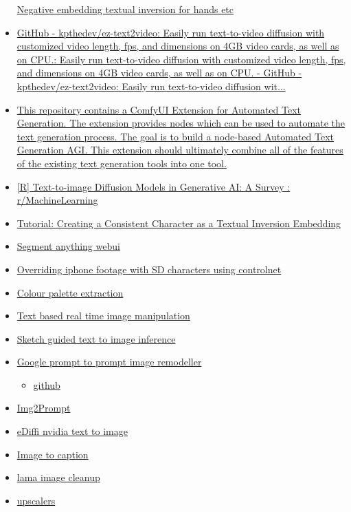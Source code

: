 \begin{itemize}
  \href{https://huggingface.co/datasets/Nerfgun3/bad_prompt}{Negative
  embedding textual inversion for hands etc}
\item
  \href{https://github.com/kpthedev/ez-text2video}{GitHub -
  kpthedev/ez-text2video: Easily run text-to-video diffusion with
  customized video length, fps, and dimensions on 4GB video cards, as
  well as on CPU.: Easily run text-to-video diffusion with customized
  video length, fps, and dimensions on 4GB video cards, as well as on
  CPU. - GitHub - kpthedev/ez-text2video: Easily run text-to-video
  diffusion wit...}
\item
  \href{https://github.com/xXAdonesXx/NodeGPT}{This repository contains
  a ComfyUI Extension for Automated Text Generation. The extension
  provides nodes which can be used to automate the text generation
  process. The goal is to build a node-based Automated Text Generation
  AGI. This extension should ultimately combine all of the features of
  the existing text generation tools into one tool.}
\item
  \href{https://www.reddit.com/r/MachineLearning/comments/12ehcez/r_texttoimage_diffusion_models_in_generative_ai_a/}{{[}R{]}
  Text-to-image Diffusion Models in Generative AI: A Survey :
  r/MachineLearning}
\item
  \href{https://github.com/BelieveDiffusion/tutorials/discussions/3}{Tutorial:
  Creating a Consistent Character as a Textual Inversion Embedding}
\item
  \href{https://www.reddit.com/r/StableDiffusion/comments/12hkdy8/sd_webui_segment_everything/}{Segment
  anything webui}
\item
  \href{https://www.reddit.com/r/StableDiffusion/comments/12lg8mn/override_more_experiments_overriding_the_original/}{Overriding
  iphone footage with SD characters using controlnet}
\item
  \href{https://github.com/mattdesl/gifenc}{Colour palette extraction}
\item
  \href{https://arxiv.org/abs/2210.09276}{Text based real time image
  manipulation}
\item
  \href{https://sketch-guided-diffusion.github.io/}{Sketch guided text
  to image inference}
\item
  \href{https://www.youtube.com/watch?v=lHcPtbZ0Mnc}{Google prompt to
  prompt image remodeller}

  \begin{itemize}
   
  \item
    \href{https://github.com/google/prompt-to-prompt}{github}
  \end{itemize}
\item
  \href{https://replicate.com/methexis-inc\#}{Img2Prompt}
\item
  \href{https://deepimagination.cc/eDiffi/}{eDiffi nvidia text to image}
\item
  \href{https://laion.ai/blog/laion-coco/}{Image to caption}
\item
  \href{https://github.com/Sanster/lama-cleaner}{lama image cleanup}
\item
  \href{https://upscale.wiki/wiki/Model_Database}{upscalers}


\end{itemize}
